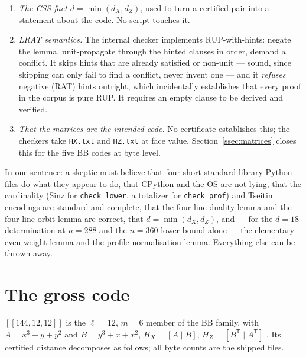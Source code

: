 \documentclass[11pt]{amsart}
\newcommand{\HX}{H_{X}}
\newcommand{\HZ}{H_{Z}}
\newcommand{\dX}{d_{X}}
\newcommand{\dZ}{d_{Z}}
\newcommand{\gross}{[[144,12,12]]}
\theoremstyle{plain}
\theoremstyle{definition}
\theoremstyle{remark}
\begin{document}
\begin{enumerate}
a row-profile invariant and a one-slice lex-leader to the weight-bounded search
leaves satisfiability unchanged. Its hypothesis --- that the two generating
translations are automorphisms of both $\HX$ and $\HZ$ --- is machine-checked by
\texttt{check\_prof.py} (rowspace equality). The lemma's conclusion is on paper;
it is tested against brute force on $31$ small codes and, at $n=288$, by
re-normalising the known weight-$18$ logical, but it is \emph{not} cross-checked
by a second independent encoding at the decisive weight-$16$ rung. This is the
one soundness dependency peculiar to the $d=18$ result; \S\ref{sec:288} states
it in full.
\item \emph{The CSS fact $d=\min(\dX,\dZ)$}, used to turn a certified pair
into a statement about the code. No script touches it.
\item \emph{LRAT semantics.} The internal checker implements RUP-with-hints:
negate the lemma, unit-propagate through the hinted clauses in order, demand a
conflict. It skips hints that are already satisfied or non-unit --- sound, since
skipping can only fail to find a conflict, never invent one --- and it
\emph{refuses} negative (RAT) hints outright, which incidentally establishes
that every proof in the corpus is pure RUP. It requires an empty clause to be
derived and verified.
\item \emph{That the matrices are the intended code.} No certificate
establishes this; the checkers take \texttt{HX.txt} and \texttt{HZ.txt} at face
value. Section~\ref{ssec:matrices} closes this for the five BB codes at byte
level.
\end{enumerate}

\noindent In one sentence: a skeptic must believe that four short
standard-library Python files do what they appear to do, that CPython and the
OS are not lying, that the cardinality (Sinz for \texttt{check\_lower}, a
totalizer for \texttt{check\_prof}) and Tseitin encodings are standard and
complete, that the four-line duality lemma and the four-line orbit lemma are
correct, that $d=\min(\dX,\dZ)$, and --- for the $d=18$ determination at $n=288$
and the $n=360$ lower bound alone --- the elementary even-weight lemma and the
profile-normalisation lemma. Everything else can be thrown away.

\section{The gross code}\label{ssec:gross}

$\gross$ is the $\ell=12$, $m=6$ member of the BB family, with
$A=x^{3}+y+y^{2}$ and $B=y^{3}+x+x^{2}$, $\HX=[A\mid B]$,
$\HZ=[B^{\mathsf T}\mid A^{\mathsf T}]$ \cite{BCGMRY}. Its certified distance
decomposes as follows; all byte counts are the shipped files.
\end{document}
